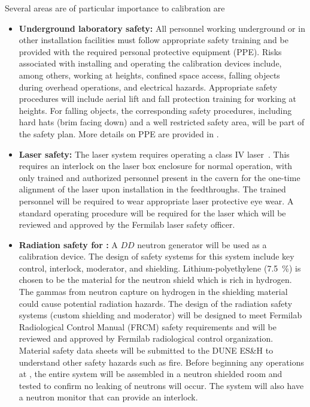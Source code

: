 Several areas are of particular importance to calibration are
\begin{itemize}
\item {\bf Underground laboratory safety:} All personnel working underground or in other installation facilities must follow appropriate safety training and be provided with the required personal protective equipment (PPE). Risks associated with installing and operating the calibration devices include, among others, working at heights, confined space access, falling objects during overhead operations, and electrical hazards. Appropriate safety procedures will include aerial lift and fall protection training for working at heights. For falling objects, the corresponding safety procedures, including hard hats (brim facing down) and a well restricted safety area, will be part of the safety plan. More details on PPE are provided in  \tcchesh.

\item {\bf Laser safety:} The laser system requires operating a class IV laser~\cite{FNAL:Class4Lasers,CERN:Class4Lasers}. This requires an interlock on the laser box enclosure for normal operation, with only trained and authorized personnel present in the cavern for the one-time alignment of the laser upon installation in the feedthroughs. The trained personnel will be required to wear appropriate laser protective eye wear. A standard operating procedure will be required for the laser which will be reviewed and approved by the Fermilab laser safety officer. 

\item {\bf Radiation safety for :} A $DD$ neutron generator will be used as a calibration device. The design of safety systems for this system include key control, interlock, moderator, and shielding. Lithium-polyethylene (\SI{7.5}{\%}) is chosen to be the material for the neutron shield which is rich in hydrogen. The gammas from neutron capture on hydrogen in the shielding material could cause potential radiation hazards. The design of the radiation safety systems (custom shielding and moderator) will be designed to meet Fermilab Radiological Control Manual (FRCM) safety requirements and will be reviewed and approved by Fermilab radiological control organization. Material safety data sheets will be submitted to the DUNE ES\&H to understand other safety hazards such as fire. Before beginning any operations at , the entire system will be assembled in a neutron shielded room and tested to confirm no leaking of neutrons will occur. The system will also have a neutron monitor that can provide an interlock. 


\end{itemize}
